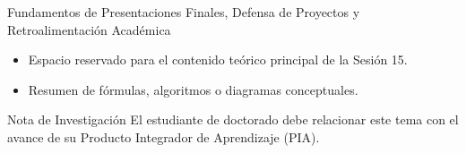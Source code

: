 \documentclass[aspectratio=169, 10pt]{beamer}
\begin{document}
\begin{frame}{Fundamentos de Presentaciones Finales, Defensa de Proyectos y Retroalimentación Académica}
    \begin{itemize}
        \item Espacio reservado para el contenido teórico principal de la Sesión 15.
        \item Resumen de fórmulas, algoritmos o diagramas conceptuales.
    \end{itemize}
    \begin{block}{Nota de Investigación}
        El estudiante de doctorado debe relacionar este tema con el avance de su Producto Integrador de Aprendizaje (PIA).
    \end{block}
\end{frame}
\end{document}
